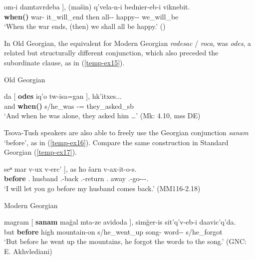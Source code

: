 \begin{enumerate}[label=\Roman*.]
\begin{exe}
		\gll {{\normalfont[} \textbf{rodesac}} 	om-i	{damtavrdeba {\normalfont]}},	(mašin)	q'vela-n-i	bednier-eb-i	viknebit.	\\	
		\textbf{when({\Rel})}	war-{\Nom}	it\_will\_end	then	all-{\Pl}-{\Nom}	happy-{\Pl}-{\Nom}	we\_will\_be	\\
		\trans `When the war ends, (then) we shall all be happy.’ 
		\hfill (\cite[129]{hewitt87})
	\end{exe}


In Old Georgian, the equivalent for Modern Georgian \textit{rodesac} / \textit{roca}, was \textit{odes}, a related but structurally different conjunction, which also preceded the subordinate clause, as in (\ref{temp-ex15}).


	\begin{exe}
		\ex\label{temp-ex15}
		Old Georgian
        
		\gll da	{{\normalfont[} \textbf{odes}}	iq'o	{tw-isa=gan {\normalfont ]}},	hk'itxes... \\
		and	\textbf{when({\Rel})}	s/he\_was	{\Refl}-{\Gen}={\Abl}	they\_asked\_sb \\	
        \trans `And when he was alone, they asked him …’ 
		\hfill (Mk: 4.10, mss DE)
	\end{exe}


Tsova-Tush speakers are also able to freely use the Georgian conjunction \textit{sanam} ‘before’,  as in (\ref{temp-ex16}). Compare the same construction in Standard Georgian (\ref{temp-ex17}).


	\begin{exe}
		\ex\label{temp-ex16}
		\gll {{\normalfont[} \textbf{sanam}}	seⁿ	mar	v-ux	{v-erc' {\normalfont]}},	as	ħo	šarn	v-ax-it-o-s.    \\
		\textbf{before}	{\Fsg}.{\Gen}	husband	{\M}.{\Sg}-back	{\M}.{\Sg}-return	{\Fsg}.{\Erg}	{\Ssg}	away	{\M}.{\Sg}-go-{\Caus}-{\Npst}-{\Fsg}.{\Erg}   \\
		\trans `I will let you go before my husband comes back.’
		\hfill (MM116-2.18)
	\end{exe}



	\begin{exe}
		\ex\label{temp-ex17}
		Modern Georgian
        
		\gll magram	{{\normalfont[} \textbf{sanam}}	ma\u{g}al	mta-ze	{avidoda {\normalfont]}},    sim\u{g}er-is	sit'q'v-eb-i	daavic'q'da.	\\
		but	\textbf{before}	high	mountain-on	s/he\_went\_up  song-{\Gen}	word-{\Pl}-{\Nom}	s/he\_forgot	\\
		\trans `But before he went up the mountains, he forgot the words to the song.’ 
		\hfill (GNC: E. Akhvlediani)
	\end{exe}



\end{enumerate}
